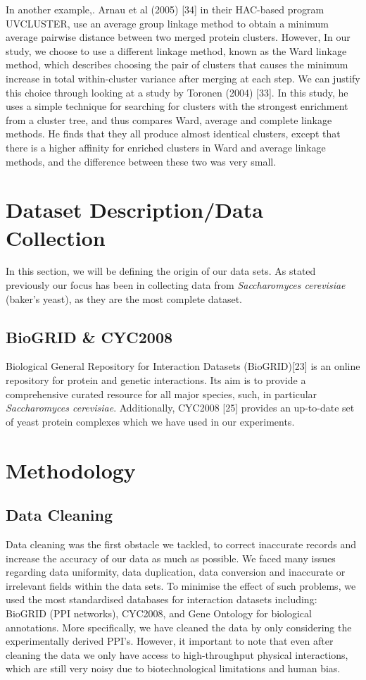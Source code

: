 \documentclass[9pt]{article}
\begin{document}
In another example,. Arnau et al (2005) [34] in their HAC-based program UVCLUSTER, use an average group linkage method to obtain a minimum average pairwise distance between two merged protein clusters. However, In our study, we choose to use a different linkage method, known as the Ward linkage method, which describes choosing the pair of clusters that causes the minimum increase in total within-cluster variance after merging at each step. We can justify this choice through looking at a study by Toronen (2004) [33]. In this study, he uses a simple technique for searching for clusters with the strongest enrichment from a cluster tree, and thus compares Ward, average and complete linkage methods. He finds that they all produce almost identical clusters, except that there is a higher affinity for enriched clusters in Ward and average linkage methods, and the difference between these two was very small.

\section{Dataset Description/Data Collection}
In this section, we will be defining the origin of our data sets. As stated previously our focus has been in collecting data from \textit{Saccharomyces cerevisiae} (baker’s yeast), as they are the most complete dataset.

\subsection{BioGRID \& CYC2008}
Biological General Repository for Interaction Datasets (BioGRID)[23] is an online repository for protein and genetic interactions. Its aim is to provide a comprehensive curated resource for all major species, such, in particular \textit{Saccharomyces cerevisiae}. Additionally, CYC2008 [25] provides an up-to-date set of yeast protein complexes which we have used in our experiments.

\section{Methodology}
\subsection{Data Cleaning}
Data cleaning was the first obstacle we tackled, to correct inaccurate records and increase the accuracy of our data as much as possible. We faced many issues regarding data uniformity, data duplication, data conversion and inaccurate or irrelevant fields within the data sets. To minimise the effect of such problems, we used the most standardised databases for interaction datasets including: BioGRID (PPI networks), CYC2008, and Gene Ontology for biological annotations. More specifically, we have cleaned the data by only considering the experimentally derived PPI’s. However, it important to note that even after cleaning the data we only have access to high-throughput physical interactions, which are still very noisy due to biotechnological limitations and human bias.
\end{document}
